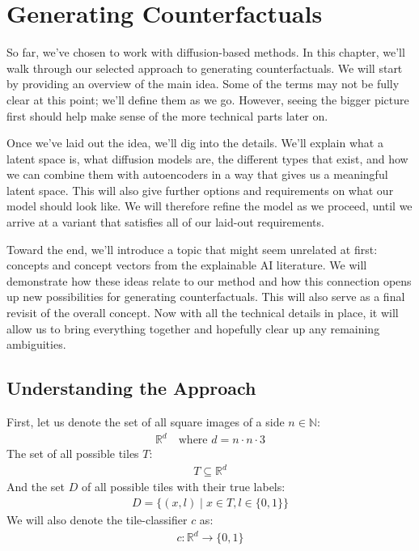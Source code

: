 \chapter{Generating Counterfactuals}

So far, we’ve chosen to work with diffusion-based methods.
In this chapter, we’ll walk through our selected approach to generating counterfactuals.
We will start by providing an overview of the main idea. Some of the terms may not be fully clear at this point; we’ll define them as we go. However, seeing the bigger picture first should help make sense of the more technical parts later on.

Once we’ve laid out the idea, we’ll dig into the details. We’ll explain what a latent space is, what diffusion models are, the different types that exist, and how we can combine them with autoencoders in a way that gives us a meaningful latent space. This will also give further options and requirements on what our model should look like. We will therefore refine the model as we proceed, until we arrive at a variant that satisfies all of our laid-out requirements.

Toward the end, we’ll introduce a topic that might seem unrelated at first: concepts and concept vectors from the explainable AI literature. We will demonstrate how these ideas relate to our method and how this connection opens up new possibilities for generating counterfactuals. This will also serve as a final revisit of the overall concept. Now with all the technical details in place, it will allow us to bring everything together and hopefully clear up any remaining ambiguities.

\section{Understanding the Approach}

First, let us denote the set of all square images of a side $n \in \mathbb{N}$:
\begin{align*}
    \mathbb{R}^{d} \quad \text{where } d = n \cdot n \cdot 3
\end{align*}
The set of all possible tiles $T$:
\begin{align*}
    T \subseteq \mathbb{R}^d
\end{align*}
And the set $D$ of all possible tiles with their true labels:
\begin{align*}
    D = \{ (x,l) \mid x \in T, l \in \{0,1\}\}
\end{align*}
We will also denote the tile-classifier $c$ as:
\begin{align*}
   c : \mathbb{R}^d \to \{0,1\}
\end{align*}

